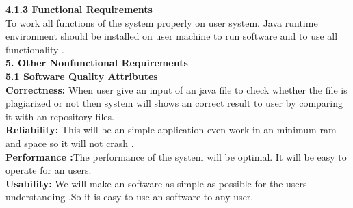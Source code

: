 	\textbf{4.1.3	Functional Requirements}\\
	To work all functions of the system properly on user system. Java runtime environment should be installed on user machine to run software and to use all functionality . \\
	\textbf{5.	Other Nonfunctional Requirements}\\
	\textbf{5.1	Software Quality Attributes}\\
	\textbf{Correctness:} When user give an input of an java file to check whether the file is plagiarized or not then system will shows an correct result to user by comparing it with an repository files.\\
	\textbf{Reliability:} This will be an simple application even work in an minimum ram and space so it will not crash .\\
	\textbf{Performance :}The performance of the system will be optimal. It will be easy to operate for an users.\\
	\textbf{Usability:} We will make an software as simple as possible for the users understanding .So it is easy to use an software to any user.\\
